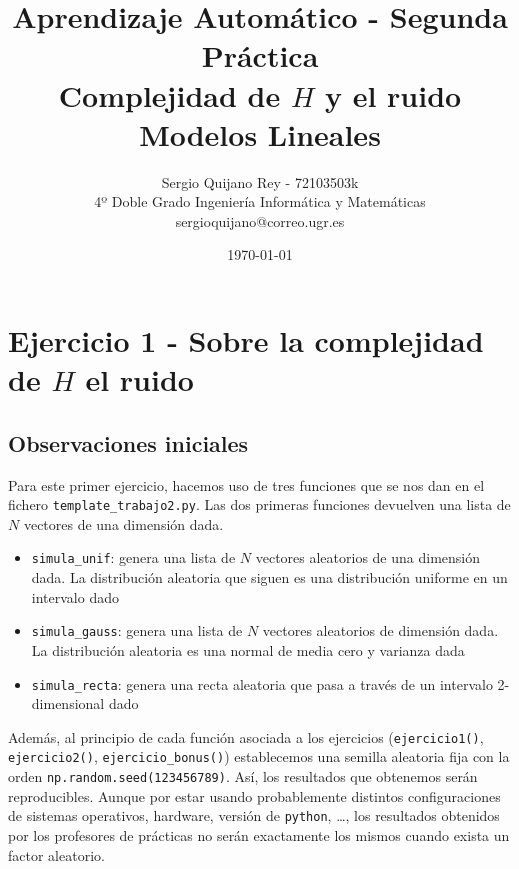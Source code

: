 \documentclass[11pt]{article}
\title{
    {Aprendizaje Automático - Segunda Práctica}\\
    {Complejidad de $H$ y el ruido}\\
    {Modelos Lineales}
}
\author{
    {Sergio Quijano Rey - 72103503k}\\
    {4º Doble Grado Ingeniería Informática y Matemáticas}\\
    {sergioquijano@correo.ugr.es}
}
\date{\today}
\begin{document}
\maketitle
\pagebreak

\tableofcontents

\listoffigures




\pagebreak

\section{Ejercicio 1 - Sobre la complejidad de $H$ el ruido}

\subsection{Observaciones iniciales}

Para este primer ejercicio, hacemos uso de tres funciones que se nos dan en el fichero \lstinline{template_trabajo2.py}. Las dos primeras funciones devuelven una lista de $N$ vectores de una dimensión dada.

\begin{itemize}
    \item \lstinline{simula_unif}: genera una lista de $N$ vectores aleatorios de una dimensión dada. La distribución aleatoria que siguen es una distribución uniforme en un intervalo dado
    \item \lstinline{simula_gauss}: genera una lista de $N$ vectores aleatorios de dimensión dada. La distribución aleatoria es una normal de media cero y varianza dada
    \item \lstinline{simula_recta}: genera una recta aleatoria que pasa a través de un intervalo 2-dimensional dado
\end{itemize}

Además, al principio de cada función asociada a los ejercicios (\lstinline{ejercicio1()}, \lstinline{ejercicio2()}, \lstinline{ejercicio_bonus()}) establecemos una semilla aleatoria fija con la orden \lstinline{np.random.seed(123456789)}. Así, los resultados que obtenemos serán reproducibles. Aunque por estar usando probablemente distintos configuraciones de sistemas operativos, hardware, versión de \lstinline{python}, \ldots, los resultados obtenidos por los profesores de prácticas no serán exactamente los mismos cuando exista un factor aleatorio.
\end{document}
